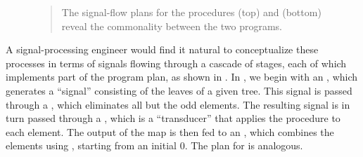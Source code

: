 \begin{figure}[tb]
\label{Figure 2.7}
\centering

\begin{quote}
 The signal-flow plans for the procedures  (top) and  (bottom) reveal the commonality between the two programs.
\end{quote}
\end{figure}

\noindent
A signal-processing engineer would find it natural to conceptualize these
processes in terms of signals flowing through a cascade of stages, each of
which implements part of the program plan, as shown in .  In
, we begin with an , which generates
a ``signal'' consisting of the leaves of a given tree.  This signal is passed
through a , which eliminates all but the odd elements.  The
resulting signal is in turn passed through a , which is a
``transducer'' that applies the  procedure to each element.  The
output of the map is then fed to an , which combines the
elements using \code{+}, starting from an initial 0.  The plan for
 is analogous.

